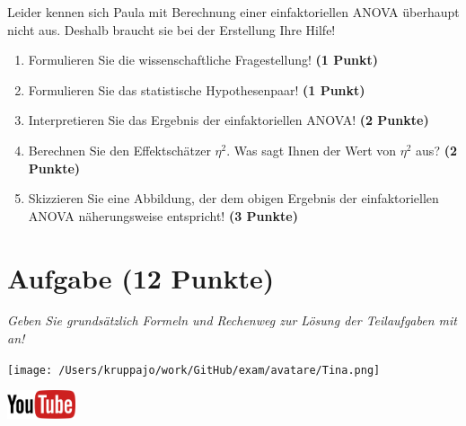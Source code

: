 \documentclass[a4paper, 9pt]{scrartcl}\usepackage[]{graphicx}\usepackage[]{xcolor}
\begin{document}
\vspace{1ex}

Leider kennen sich Paula mit Berechnung einer einfaktoriellen ANOVA überhaupt nicht aus. Deshalb braucht sie bei der Erstellung Ihre Hilfe! 

\begin{enumerate}
  \item Formulieren Sie die wissenschaftliche Fragestellung! \textbf{(1 Punkt)}
  \item Formulieren Sie das statistische Hypothesenpaar! \textbf{(1 Punkt)}
\item Interpretieren Sie das Ergebnis der einfaktoriellen ANOVA! \textbf{(2 Punkte)} 
\item Berechnen Sie den Effektschätzer $\eta^2$. Was sagt Ihnen der Wert von $\eta^2$ aus? \textbf{(2 Punkte)}
\item Skizzieren Sie eine Abbildung, der dem obigen Ergebnis der
  einfaktoriellen ANOVA näherungsweise entspricht! \textbf{(3 Punkte)}
\end{enumerate}

 
\clearpage

\section{Aufgabe \hfill (12 Punkte)}

\textit{Geben Sie grundsätzlich Formeln und Rechenweg zur Lösung der Teilaufgaben mit an!} \\[1Ex]
 

 
\begin{minipage}[t]{0.5\textwidth}
\texttt{[image: /Users/kruppajo/work/GitHub/exam/avatare/Tina.png]}
\end{minipage}
\begin{minipage}[t]{0.5\textwidth}
\hfill
\href{https://youtu.be/8Pb2sKUIMyk}{\includegraphics[width = 2cm]{img/youtube}}\\[1Ex]
\end{minipage}
\vspace{1ex}
\end{document}
